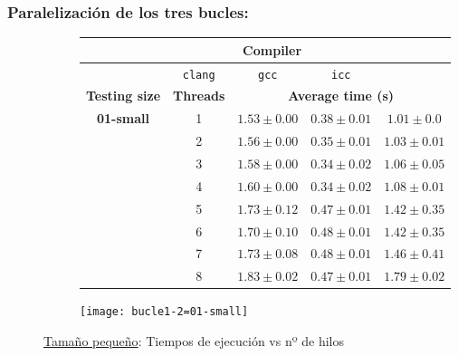 
\subsubsection{\textbf{Paralelización de los tres bucles:}}

\begin{figure}[H]
    \centering
    \begin{subfigure}{0.4\textwidth}
        \begin{adjustbox}{width=\textwidth} 
        \begin{tabular}{|c|c|c|c|c|}
            \hline
            \rowcolor{azul} \multicolumn{2}{|c|}{}&\multicolumn{3}{c|}{\textbf{Compiler}} \\ \hline
            \rowcolor{azul} \multicolumn{2}{|c|}{}&\texttt{clang}&\texttt{gcc}&\texttt{icc}\\ \hline
            \rowcolor{azul} \textbf{Testing size} & \textbf{Threads}&\multicolumn{3}{c|}{\textbf{Average time (s)}} \\ \hline
            \multirow{8}{1cm}{\textbf{01-small}} & 1 & \(1.53\pm{0.00}\) & \(0.38\pm{0.01}\) & \(1.01\pm{0.0}\) \\ \cline{2-5}
            & 2 & \(1.56\pm{0.00}\) & \(0.35\pm{0.01}\) & \(1.03\pm{0.01}\) \\ \cline{2-5}
            & 3 & \(1.58\pm{0.00}\) & \(0.34\pm{0.02}\) & \(1.06\pm{0.05}\) \\ \cline{2-5}
            & 4 & \(1.60\pm{0.00}\) & \(0.34\pm{0.02}\) & \(1.08\pm{0.01}\) \\ \cline{2-5}
            & 5 & \(1.73\pm{0.12}\) & \(0.47\pm{0.01}\) & \(1.42\pm{0.35}\) \\ \cline{2-5}
            & 6 & \(1.70\pm{0.10}\) & \(0.48\pm{0.01}\) & \(1.42\pm{0.35}\) \\ \cline{2-5}
            & 7 & \(1.73\pm{0.08}\) & \(0.48\pm{0.01}\) & \(1.46\pm{0.41}\) \\ \cline{2-5}
            & 8 & \(1.83\pm{0.02}\) & \(0.47\pm{0.01}\) & \(1.79\pm{0.02}\) \\ \hline
        \end{tabular}
        \end{adjustbox}
    \end{subfigure}
    \hfill
    \begin{subfigure}{0.5\textwidth}
        \texttt{[image: bucle1-2=01-small]}
    \end{subfigure}
    \caption{\underline{Tamaño pequeño}: Tiempos de ejecución vs nº de hilos}
    \label{fig:bucle1-2=01-small}
\end{figure}

